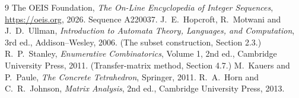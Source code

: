 \documentclass[11pt,a4paper]{article}
\theoremstyle{plain}
\theoremstyle{definition}
\begin{document}
\begin{thebibliography}{9}
 The OEIS Foundation, \emph{The On-Line Encyclopedia of Integer
Sequences}, \url{https://oeis.org}, 2026. Sequence A220037.
 J.~E.~Hopcroft, R.~Motwani and J.~D.~Ullman, \emph{Introduction to Automata
Theory, Languages, and Computation}, 3rd ed., Addison--Wesley, 2006. (The subset
construction, Section 2.3.)
 R.~P.~Stanley, \emph{Enumerative Combinatorics}, Volume 1, 2nd ed.,
Cambridge University Press, 2011. (Transfer-matrix method, Section 4.7.)
 M.~Kauers and P.~Paule, \emph{The Concrete Tetrahedron}, Springer, 2011.
 R.~A.~Horn and C.~R.~Johnson, \emph{Matrix Analysis}, 2nd ed., Cambridge
University Press, 2013.
\end{thebibliography}
\end{document}

